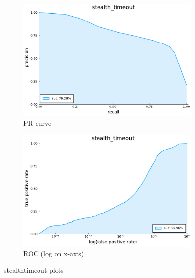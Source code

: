 \begin{figure}
    \centering
    \begin{subfigure}{.49\textwidth}
      \centering
      \includegraphics[width=1\linewidth]{pdfs/modperf/stealth_timeout.bson-pr.pdf}
      \caption{PR curve}
    \end{subfigure}
    \begin{subfigure}{.49\textwidth}
        \centering
        \includegraphics[width=1\linewidth]{pdfs/modperf/stealth_timeout.bson-roclog.pdf}
        \caption{ROC (log on x-axis)}
    \end{subfigure}
    \caption{stealthtimeout plots}
    \label{fig:fig}
\end{figure}

